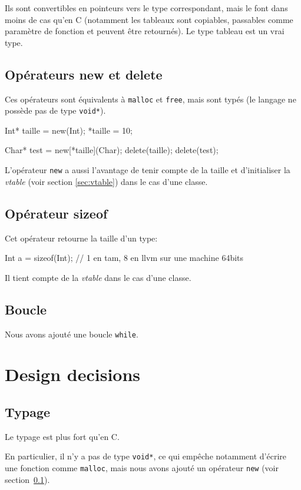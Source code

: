 \documentclass{scrartcl}
\begin{document}
    Ils sont convertibles en pointeurs vers le type correspondant, mais le font
    dans moins de cas qu'en C (notamment les tableaux sont copiables,
    passables comme paramètre de fonction et peuvent être retournés). Le type
    tableau est un vrai type.

  \subsection{Opérateurs new et delete}\label{sec:new}
    Ces opérateurs sont équivalents à \verb+malloc+ et \verb+free+, mais sont
    typés (le langage ne possède pas de type \verb+void*+).

    \begin{moccode}
Int* taille = new(Int);
*taille = 10;

Char* test = new[*taille](Char);
delete(taille);
delete(test);
    \end{moccode}

    L'opérateur \verb+new+ a aussi l'avantage de tenir compte de la taille et
    d'initialiser la \textit{vtable} (voir section \ref{sec:vtable}) dans le
    cas d'une classe.

  \subsection{Opérateur sizeof}
    Cet opérateur retourne la taille d'un type:

    \begin{moccode}
Int a = sizeof(Int); // 1 en tam, 8 en llvm sur une machine 64bits
    \end{moccode}

    Il tient compte de la \textit{vtable} dans le cas d'une classe.

  \subsection{Boucle}
    Nous avons ajouté une boucle \verb+while+.

\section{Design decisions}
  \subsection{Typage}
    Le typage est plus fort qu'en C.

    En particulier, il n'y a pas de type \verb+void*+, ce qui empêche notamment
    d'écrire une fonction comme \verb+malloc+, mais nous avons ajouté un
    opérateur \verb+new+ (voir section~\ref{sec:new}).
\end{document}
